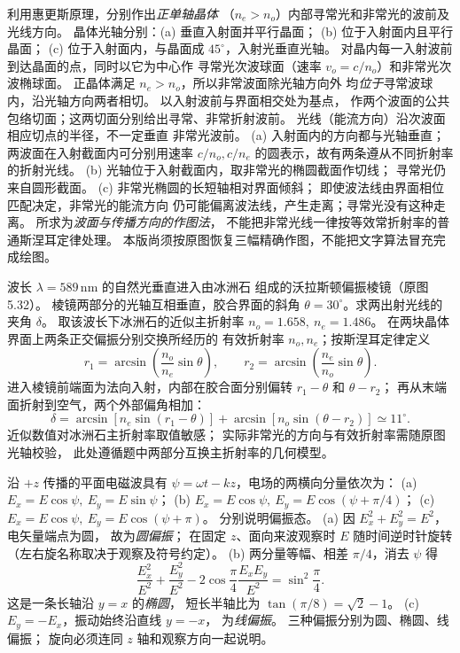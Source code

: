 利用惠更斯原理，分别作出\emph{正单轴晶体}
（$n_e>n_o$）内部寻常光和非常光的波前及光线方向。
晶体光轴分别：(a) 垂直入射面并平行晶面；
(b) 位于入射面内且平行晶面；
(c) 位于入射面内，与晶面成 $45^\circ$，入射光垂直光轴。
\exsolution
对晶内每一入射波前到达晶面的点，同时以它为中心作
寻常光次波球面（速率 $v_o=c/n_o$）和非常光次波椭球面。
正晶体满足 $n_e>n_o$，所以非常波面除光轴方向外
均\emph{位于}寻常波球内，沿光轴方向两者相切。
以入射波前与界面相交处为基点，
作两个波面的公共包络切面；这两切面分别给出寻常、非常折射波前。
光线（能流方向）沿次波面相应切点的半径，不一定垂直
非常光波前。
(a) 入射面内的方向都与光轴垂直；
两波面在入射截面内可分别用速率 $c/n_o,c/n_e$
的圆表示，故有两条遵从不同折射率的折射光线。
(b) 光轴位于入射截面内，取非常光的椭圆截面作切线；
寻常光仍来自圆形截面。
(c) 非常光椭圆的长短轴相对界面倾斜；
即使波法线由界面相位匹配决定，非常光的能流方向
仍可能偏离波法线，产生走离；寻常光没有这种走离。
\excheck 所求为\emph{波面与传播方向的作图法}，
不能把非常光线一律按等效常折射率的普通斯涅耳定律处理。
本版尚须按原图恢复三幅精确作图，不能把文字算法冒充完成绘图。

波长 $\lambda=589\,\mathrm{nm}$ 的自然光垂直进入由冰洲石
组成的沃拉斯顿偏振棱镜（原图5.32）。
棱镜两部分的光轴互相垂直，胶合界面的斜角
$\theta=30^\circ$。求两出射光线的夹角 $\delta$。
\exsolution
取该波长下冰洲石的近似主折射率
$n_o=1.658,\ n_e=1.486$。
在两块晶体界面上两条正交偏振分别交换所经历的
有效折射率 $n_o,n_e$；按斯涅耳定律定义
\[
 r_1=\arcsin\!\left(\frac{n_o}{n_e}\sin\theta\right),
 \qquad
 r_2=\arcsin\!\left(\frac{n_e}{n_o}\sin\theta\right).
\]
进入棱镜前端面为法向入射，内部在胶合面分别偏转
$r_1-\theta$ 和 $\theta-r_2$；
再从末端面折射到空气，两个外部偏角相加：
\[
 \boxed{\delta=
 \arcsin[n_e\sin(r_1-\theta)]
 +\arcsin[n_o\sin(\theta-r_2)]
 \simeq11^\circ}.
\]
\excheck 近似数值对冰洲石主折射率取值敏感；
实际非常光的方向与有效折射率需随原图光轴校验，
此处遵循题中两部分互换主折射率的几何模型。

沿 $+z$ 传播的平面电磁波具有
$\psi=\omega t-kz$，电场的两横向分量依次为：
(a) $E_x=E\cos\psi,\ E_y=E\sin\psi$；
(b) $E_x=E\cos\psi,\ E_y=E\cos(\psi+\pi/4)$；
(c) $E_x=E\cos\psi,\ E_y=E\cos(\psi+\pi)$。
分别说明偏振态。
\exsolution
(a) 因 $E_x^2+E_y^2=E^2$，电矢量端点为圆，
故为\emph{圆偏振}；
在固定 $z$、面向来波观察时 $E$ 随时间逆时针旋转
（左右旋名称取决于观察及符号约定）。
(b) 两分量等幅、相差 $\pi/4$，消去 $\psi$ 得
\[
 \frac{E_x^2}{E^2}+\frac{E_y^2}{E^2}
 -2\cos\frac{\pi}{4}\frac{E_xE_y}{E^2}
 =\sin^2\frac{\pi}{4}.
\]
这是一条长轴沿 $y=x$ 的\emph{椭圆}，
短长半轴比为
$\tan(\pi/8)=\sqrt2-1$。
(c) $E_y=-E_x$，振动始终沿直线 $y=-x$，
为\emph{线偏振}。
\excheck 三种偏振分别为圆、椭圆、线偏振；
旋向必须连同 $z$ 轴和观察方向一起说明。

